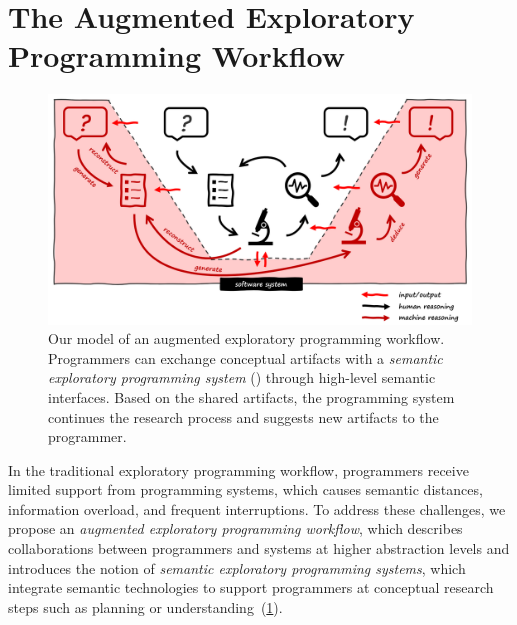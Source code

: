 
\section{The Augmented Exploratory Programming Workflow}
\label{sec:approach/workflow}

\begin{figure}
	\centering
	\includegraphics[width=\textwidth]{01_workflow/workflow.png}
	\caption[Our model of an \emph{augmented exploratory programming workflow}.]{
		Our model of an augmented exploratory programming workflow.
		Programmers can exchange conceptual artifacts with a \emph{semantic exploratory programming system} (\bold{\textcolor{red}{red}}) through high-level semantic interfaces.
		Based on the shared artifacts, the programming system continues the research process and suggests new artifacts to the programmer.
	}
	\label{fig:approach/workflow/workflow}
\end{figure}

In the traditional exploratory programming workflow, programmers receive limited support from programming systems, which causes semantic distances, information overload, and frequent interruptions.
To address these challenges, we propose an \emph{augmented exploratory programming workflow}, which describes collaborations between programmers and systems at higher abstraction levels and introduces the notion of \emph{semantic exploratory programming systems}, which integrate semantic technologies to support programmers at conceptual research steps such as planning or understanding~(\cref{fig:approach/workflow/workflow}).

